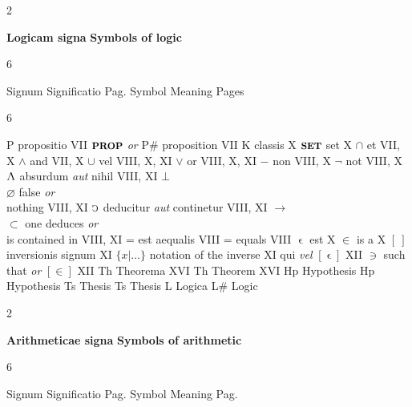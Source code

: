 \documentclass{book}
\newcommand{\s}{\switchcolumn} %
\newcommand{\C}{\mathop{\sbox0{$\displaystyle$$\reflectbox{C}$} %
\raisebox{-\height+\ht0-0.05cm}[\ht0][\dp0]{\scalebox{0.8}[0.8]{\copy0}}}\displaylimits} %
\newcommand{\abs}{\mathop{\rotatebox[origin=c]{180}{V}}}
\newcommand{\such}{\thinspace \rotatebox[origin=c]{180}{$\epsilon$}}
\newcommand{\smallIn}{\ensuremath{\mathrel{\epsilon}}}
\newcommand{\setOfSets}{\mathord{\text{{\footnotesize \textbf{SET}}}}}
\newcommand{\prop}{\mathord{\text{{\footnotesize \textbf{PROP}}}}}
\newenvironment{translateTwoCol}
               { %
                 \columnratio{0.5, 0.5}
                 \begin{paracol}{2}
                 \newcommand{\LAT}{\switchcolumn[0]*}
                 \newcommand{\ENG}{\switchcolumn[1]}
               }
               { %
                 \let\ENG\undefined
                 \let\LAT\undefined
                 \end{paracol}
               }
\newenvironment{translateSixCol}[6]
               { %
                 \setcolumnwidth{#1\fill/1em, #2\fill/1em, #3\fill/\columnsep, #4\fill/1em, #5\fill/1em, #6\fill}
                 \begin{paracol}{6}
                 \newcommand{\LAT}{\switchcolumn[0]*}
                 \newcommand{\ENG}{\switchcolumn[3]}
               }
               { %
                 \let\ENG\undefined
                 \let\LAT\undefined
                 \end{paracol}
               }
\begin{document}
\begin{translateTwoCol}
\centering
\textbf{Logicam signa}
\ENG
\textbf{Symbols of logic}
\end{translateTwoCol}

\begin{translateSixCol}{0.05}{0.35}{0.1}{0.05}{0.35}{0.1}
\raggedright
Signum \s Significatio \s Pag.
\s Symbol \s Meaning \s Pages
\end{translateSixCol}

\begin{translateSixCol}{0.06}{0.34}{0.1}{0.06}{0.34}{0.1}
\raggedright
P \s propositio \s VII
\s $\prop$ \emph{or} P\# \s proposition \s VII
\s* $\text{K}$ \s classis \s X
\s $\setOfSets$ \s set \s X
\s* $\cap$ \s et \s VII, X
\s $\wedge$ \s and \s VII, X
\s* $\cup$ \s vel \s VIII, X, XI
\s $\vee$ \s or \s VIII, X, XI
\s* $-$ \s non \s VIII, X
\s $\neg$ \s not \s VIII, X
\s* $\abs$ \s absurdum \emph{aut} nihil \s VIII, XI
\s $\bot$ \\ $\varnothing$ \s false \emph{or} \\ \quad nothing \s VIII, XI
\s* $\C$ \s deducitur \emph{aut} continetur \s VIII, XI
\s $\rightarrow$ \\ $\subset$ \s one deduces \emph{or} \\ \quad is contained in \s VIII, XI
\s* = \s est aequalis \s VIII
\s = \s equals \s VIII
\s* $\smallIn$ \s est \s X
\s $\in$ \s is a \s X   %
\s* $[ \ ]$ \s inversionis signum \s XI
\s $\{ x | \ldots \}$ \s notation of the inverse \s XI  %
\s* \such \s qui \emph{vel} $[ \smallIn ]$ \s XII
\s $\ni$ \s such that \emph{or} $[ \in ]$ \s XII
\s* Th \s Theorema \s XVI
\s  Th \s Theorem \s XVI
\s* Hp \s Hypothesis \s
\s  Hp \s Hypothesis \s
\s* Ts \s Thesis \s
\s  Ts \s Thesis \s
\s* L \s Logica \s
\s  L\# \s Logic \s
\end{translateSixCol}

\vspace{1em}
\begin{translateTwoCol}
\centering
\textbf{Arithmeticae signa}
\ENG
\textbf{Symbols of arithmetic}
\end{translateTwoCol}

\begin{translateSixCol}{0.05}{0.35}{0.1}{0.05}{0.35}{0.1}
\raggedright
Signum \s Significatio \s Pag.
\s Symbol \s Meaning \s Pag.
\end{translateSixCol}
\end{document}

